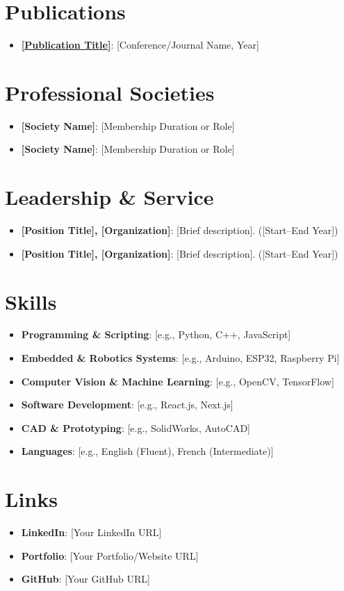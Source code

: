 \documentclass[letterpaper,11pt]{article}
\newcommand{\resumeItem}[2]{
  \item\small{
    \textbf{#1}{: #2 \vspace{-2pt}}
  }
}
\newcommand{\resumeSubItem}[2]{\resumeItem{#1}{#2}\vspace{-4pt}}
\newcommand{\resumeSubHeadingListStart}{\begin{itemize}[leftmargin=*]}
\newcommand{\resumeSubHeadingListEnd}{\end{itemize}}
\begin{document}
\section{Publications}
  \resumeSubHeadingListStart 
    \resumeSubItem{\href{[Publication URL]}{[Publication Title]}}
      {[Conference/Journal Name, Year]}
  \resumeSubHeadingListEnd

\section{Professional Societies}
  \resumeSubHeadingListStart
    \resumeSubItem{[Society Name]}{[Membership Duration or Role]}
    \resumeSubItem{[Society Name]}{[Membership Duration or Role]}
  \resumeSubHeadingListEnd

\section{Leadership \& Service}
  \resumeSubHeadingListStart
    \resumeSubItem{[Position Title], [Organization]}{[Brief description]. ([Start–End Year])}
    \resumeSubItem{[Position Title], [Organization]}{[Brief description]. ([Start–End Year])}
  \resumeSubHeadingListEnd

\section{Skills}
  \resumeSubHeadingListStart
    \resumeSubItem{Programming \& Scripting}{[e.g., Python, C++, JavaScript]}
    \resumeSubItem{Embedded \& Robotics Systems}{[e.g., Arduino, ESP32, Raspberry Pi]}
    \resumeSubItem{Computer Vision \& Machine Learning}{[e.g., OpenCV, TensorFlow]}
    \resumeSubItem{Software Development}{[e.g., React.js, Next.js]}
    \resumeSubItem{CAD \& Prototyping}{[e.g., SolidWorks, AutoCAD]}
    \resumeSubItem{Languages}{[e.g., English (Fluent), French (Intermediate)]}
  \resumeSubHeadingListEnd

\section{Links}
  \resumeSubHeadingListStart
    \resumeSubItem{LinkedIn}{[Your LinkedIn URL]}  
    \resumeSubItem{Portfolio}{[Your Portfolio/Website URL]}
    \resumeSubItem{GitHub}{[Your GitHub URL]}
  \resumeSubHeadingListEnd

\end{document}
